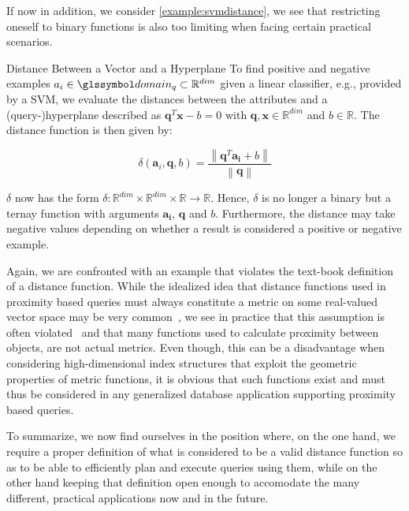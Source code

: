 If now in addition, we consider \cref{example:svmdistance}, we see that restricting oneself to binary functions is also too limiting when facing certain practical scenarios.

\begin{example}[label=example:svmdistance]{Distance Between a Vector and a Hyperplane}{}
    To find positive and negative examples $a_{i} \in \domain_q \subset \mathbb{R}^{dim}$ given a linear classifier, e.g., provided by a SVM, we evaluate the distances between the attributes and a (query-)hyperplane described as $\mathbf{q}^T\mathbf{x} - b = 0$ with $\mathbf{q},\mathbf{x} \in \mathbb{R}^{dim}$ and $b \in \mathbb{R}$. The distance function is then given by:

    \begin{equation}
        \delta (\mathbf{a}_i, \mathbf{q}, b) = \frac{\left\|\mathbf{q}^T \mathbf{a_i} + b \right\|}{\left\|\mathbf{q}\right\|}
    \end{equation}
    
    $\delta$ now has the form $\delta \colon \mathbb{R}^{dim} \times \mathbb{R}^{dim} \times \mathbb{R} \to \mathbb{R}$. Hence, $\delta$ is no longer a binary but a ternay function with arguments $\mathbf{a_{i}}$, $\mathbf{q}$ and $b$. Furthermore, the distance may take negative values depending on whether a result is considered a positive or negative example.
\end{example}


Again, we are confronted with an example that violates the text-book definition of a distance function. While the idealized idea that distance functions used in proximity based queries must always constitute a metric on some real-valued vector space may be very common~\cite{Zezula:2006similarity}, we see in practice that this assumption is often violated~\cite{Bernhauer:2019Nonmetric}  and that many functions used to calculate proximity between objects, are not actual metrics. Even though, this can be a disadvantage when considering high-dimensional index structures that exploit the geometric properties of metric functions, it is obvious that such functions exist and must thus be considered in any generalized database application supporting proximity based queries. 

To summarize, we now find ourselves in the position where, on the one hand, we require a proper definition of what is considered to be a valid distance function so as to be able to efficiently plan and execute queries using them, while on the other hand keeping that definition open enough to accomodate the many different, practical applications now and in the future.

